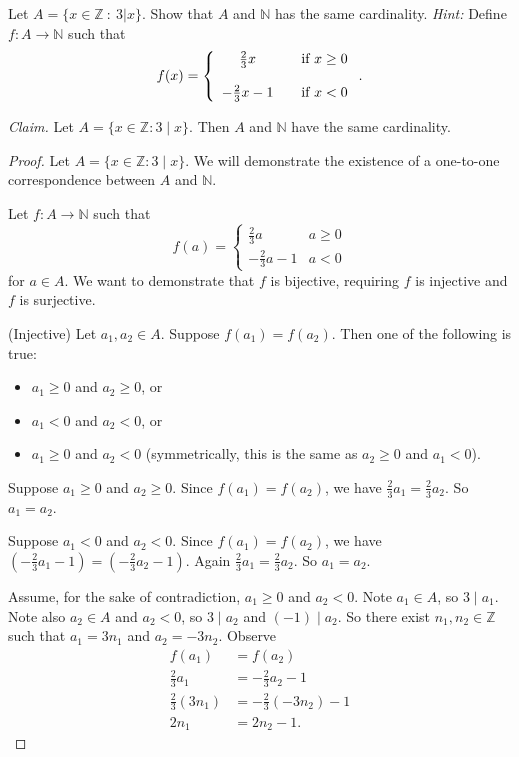 \documentclass{article}
\newcommand{\Z}{\mathbb{Z}}
\newcommand{\N}{\mathbb{N}}
\theoremstyle{definition}
\begin{document}
\begin{question}
    Let $A = \{ x \in \Z ~:~ 3|x \}$.  Show that $A$ and $\mathbb{N}$ has the same cardinality.  {\it Hint:} Define $f: A \rightarrow \N$ such that
\[ f(x) =\left\{\begin{array}{c c l} \frac{2}{3}x & & \text{if } x \geq 0 \\ ~ \\ -\frac{2}{3}x - 1 &  & \text{if } x < 0 \end{array} \right. .\]
\end{question}
\begin{solution}\newline

\noindent\textit{Claim. }Let $A=\{x\in\Z:3\mid x\}$. Then $A$ and $\N$ have the same cardinality.
\begin{proof}
Let $A=\{x\in\Z:3\mid x\}$. We will demonstrate the existence of a one-to-one correspondence between $A$ and $\N$. \newline

\noindent Let $f:A\to\N$ such that
\[f(a) = \begin{cases} 
\frac{2}{3}a&a\geq 0\\
-\frac{2}{3}a-1&a<0
\end{cases}
\]
for $a\in A$. We want to demonstrate that $f$ is bijective, requiring $f$ is injective and $f$ is surjective.\newline

\noindent(Injective) Let $a_1,a_2\in A$. Suppose $f(a_1)=f(a_2)$. Then one of the following is true:
\begin{itemize}
    \item $a_1\geq 0$ and $a_2\geq 0$, or
    \item $a_1<0$ and $a_2<0$, or
    \item $a_1\geq 0$ and $a_2<0$ (symmetrically, this is the same as $a_2\geq 0$ and $a_1<0$).
\end{itemize}

Suppose $a_1\geq 0$ and $a_2\geq 0$. Since $f(a_1)=f(a_2)$, we have $\frac{2}{3}a_1=\frac{2}{3}a_2$. So $a_1=a_2$.\newline

Suppose $a_1<0$ and $a_2<0$. Since $f(a_1)=f(a_2)$, we have $\left(-\frac{2}{3}a_1-1\right)=\left(-\frac{2}{3}a_2-1\right)$. Again $\frac{2}{3}a_1=\frac{2}{3}a_2$. So $a_1=a_2$.\newline

Assume, for the sake of contradiction, $a_1\geq 0$ and $a_2<0$. Note $a_1\in A$, so $3\mid a_1$. Note also $a_2\in A$ and $a_2<0$, so $3\mid a_2$ and $(-1)\mid a_2$. So there exist $n_1,n_2\in\Z$ such that $a_1=3n_1$ and $a_2=-3n_2$. Observe
\begin{align*}
f(a_1)&=f(a_2)\\
\frac{2}{3}a_1&=-\frac{2}{3}a_2-1\\
\frac{2}{3}(3n_1)&=-\frac{2}{3}(-3n_2)-1\\
2n_1&=2n_2-1.
\end{align*}


\end{proof}
\end{solution}
\end{document}
